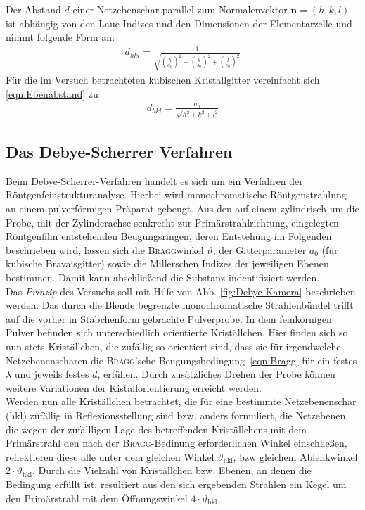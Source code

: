 \documentclass[a4paper,twoside,final]{article}
\begin{document}
Der Abstand $d$ einer Netzebenschar parallel zum Normalenvektor $\bm{n}=(h,k,l)$ ist abhängig von den Laue-Indizes und den Dimensionen der Elementarzelle und nimmt folgende Form an:
\begin{align}
  d_{hkl} = \frac{1}{\sqrt{\left(\frac{h}{a_0}\right)^2+\left(\frac{k}{b_0}\right)^2+\left(\frac{l}{c_0}\right)^2}}\label{eqn:Ebenabstand}
\end{align}
Für die im Versuch betrachteten kubischen Kristallgitter vereinfacht sich \eqref{eqn:Ebenabstand} zu
\begin{align}
  d_{hkl} = \frac{a_0}{\sqrt{h^2+k^2+l^2}}\label{eqn:Abstand_kubisch}
\end{align}

\subsection{Das Debye-Scherrer Verfahren}
Beim Debye-Scherrer-Verfahren handelt es sich um ein Verfahren der Röntgenfeinstrukturanalyse. Hierbei wird monochromatische Röntgenstrahlung an einem pulverförmigen Präparat gebeugt. Aus den auf einem zylindrisch um die Probe, mit der Zylinderachse senkrecht zur Primärstrahlrichtung, eingelegten Röntgenfilm entstehenden Beugungsringen, deren Entstehung im Folgenden beschrieben wird, lassen sich die \textsc{Bragg}winkel $\vartheta$, der Gitterparameter $a_0$ (für kubische Bravaisgitter) sowie die Millerschen Indizes der jeweiligen Ebenen bestimmen. Damit kann abschließend die Substanz indentifiziert werden.\\
Das \textit{Prinzip} des Versuchs soll mit Hilfe von Abb. \ref{fig:Debye-Kamera} beschrieben werden. Das durch die Blende begrenzte monochromatische Strahlenbündel trifft auf die vorher in Stäbchenform gebrachte Pulverprobe. In dem feinkörnigen Pulver befinden sich unterschiedlich orientierte Kriställchen. Hier finden sich so nun stets Kriställchen, die zufällig so orientiert sind, dass sie für irgendwelche Netzebenenscharen die \textsc{Bragg}'sche Beugungsbedingung~\eqref{eqn:Bragg} für ein festes $\lambda$ und jeweils festes $d$, erfüllen. Durch zusätzliches Drehen der Probe können weitere Variationen der Kistallorientierung erreicht werden.\\
Werden nun alle Kriställchen betrachtet, die für eine bestimmte Netzebenenschar (hkl) zufällig in Reflexionsstellung sind bzw. anders formuliert, die Netzebenen, die wegen der zufällligen Lage des betreffenden Kriställchens mit dem Primärstrahl den nach der \textsc{Bragg}-Bedinung erforderlichen Winkel einschließen, reflektieren diese alle unter dem gleichen Winkel $\vartheta_\text{hkl}$, bzw gleichem Ablenkwinkel $2\cdot\vartheta_\text{hkl}$. Durch die Vielzahl von Kriställchen bzw. Ebenen, an denen die Bedingung erfüllt ist, resultiert aus den sich ergebenden Strahlen ein Kegel um den Primärstrahl mit dem Öffnungswinkel $4\cdot\vartheta_\text{hkl}$. \\
\end{document}
